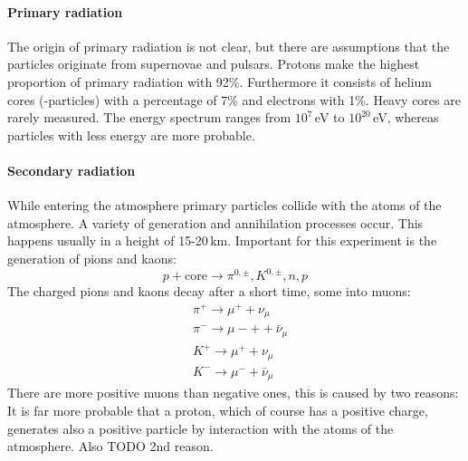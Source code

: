\paragraph{Primary radiation}
The origin of primary radiation is not clear, but there are assumptions that the particles originate from supernovae and pulsars.
Protons make the highest proportion of primary radiation with 92\%. Furthermore it consists of helium cores (\textalpha-particles) with a percentage 
of 7\% and electrons with 1\%. Heavy cores are rarely measured. The energy spectrum ranges from $10^7$\,eV to $10^{20}$\,eV, whereas particles with 
less energy are more probable.
\paragraph{Secondary radiation}
While entering the atmosphere primary particles collide with the atoms of the atmosphere. A variety of generation and annihilation processes occur. 
This happens usually in a height of 15-20\,km.
Important for this experiment is the generation of pions and kaons:
\begin{equation}
    p + \text{core} \rightarrow \pi^{0, \pm}, K^{0, \pm}, n, p
\end{equation}
The charged pions and kaons decay after a short time, some into muons:
\begin{equation}
    \begin{split}
        & \pi^+ \rightarrow \mu^+ + \nu_\mu \\
        & \pi^- \rightarrow \mu-+ + \bar{\nu}_\mu \\
        & K^+ \rightarrow \mu^+ + \nu_\mu \\
        & K^- \rightarrow \mu^- + \bar{\nu}_\mu
    \end{split}
\end{equation}
There are more positive muons than negative ones, this is caused by two reasons: It is far more probable that a proton, which of course has 
a positive charge, generates also a positive particle by interaction with the atoms of the atmosphere. Also TODO 2nd reason. %
